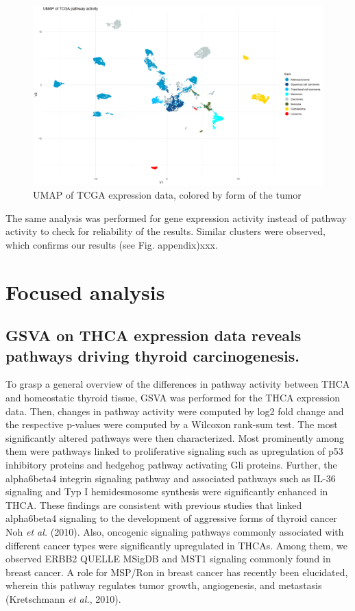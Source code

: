 \documentclass[
  parskip,
  oneside]{scrreprt}
\begin{document}
\begin{figure}

{\centering \includegraphics[width=0.5\linewidth]{figures/Pan Cancer UMAP cancer form} 

}

\caption{UMAP of TCGA expression data, colored by form of the tumor}\label{fig:UMAPPanForm}
\end{figure}

The same analysis was performed for gene expression activity instead of
pathway activity to check for reliability of the results. Similar
clusters were observed, which confirms our results (see Fig.
appendix)xxx.

\hypertarget{focused-analysis}{%
\section{Focused analysis}\label{focused-analysis}}

\hypertarget{gsva-on-thca-expression-data-reveals-pathways-driving-thyroid-carcinogenesis.}{%
\subsection{GSVA on THCA expression data reveals pathways driving
thyroid
carcinogenesis.}\label{gsva-on-thca-expression-data-reveals-pathways-driving-thyroid-carcinogenesis.}}

To grasp a general overview of the differences in pathway activity
between THCA and homeostatic thyroid tissue, GSVA was performed for the
THCA expression data. Then, changes in pathway activity were computed by
log2 fold change and the respective p-values were computed by a Wilcoxon
rank-sum test. The most significantly altered pathways were then
characterized. Most prominently among them were pathways linked to
proliferative signaling such as upregulation of p53 inhibitory proteins
and hedgehog pathway activating Gli proteins. Further, the alpha6beta4
integrin signaling pathway and associated pathways such as IL-36
signaling and Typ I hemidesmosome synthesis were significantly enhanced
in THCA. These findings are consistent with previous studies that linked
alpha6beta4 signaling to the development of aggressive forms of thyroid
cancer Noh \emph{et al.} (2010). Also, oncogenic signaling pathways
commonly associated with different cancer types were significantly
upregulated in THCAs. Among them, we observed ERBB2 QUELLE MSigDB and
MST1 signaling commonly found in breast cancer. A role for MSP/Ron in
breast cancer has recently been elucidated, wherein this pathway
regulates tumor growth, angiogenesis, and metastasis (Kretschmann
\emph{et al.}, 2010).
\end{document}
